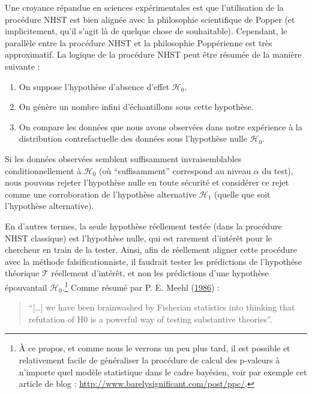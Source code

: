 \documentclass[
  a4paper,11pt,twoside,onecolumn,openright,final,oldfontcommands]{memoir}
\providecommand{\tightlist}{%
  \setlength{\itemsep}{0pt}\setlength{\parskip}{0pt}}
\theoremstyle{definition}
\theoremstyle{definition}
\theoremstyle{definition}
\theoremstyle{definition}
\theoremstyle{remark}
\begin{document}
Une croyance répandue en sciences expérimentales est que l'utilisation de la procédure NHST est bien alignée avec la philosophie scientifique de Popper (et implicitement, qu'il s'agit là de quelque chose de souhaitable). Cependant, le parallèle entre la procédure NHST et la philosophie Poppérienne est très approximatif. La logique de la procédure NHST peut être résumée de la manière suivante :

\begin{enumerate}
\def\labelenumi{\arabic{enumi}.}
\tightlist
\item
  On suppose l'hypothèse d'absence d'effet \(\mathcal{H}_{0}\).
\item
  On génère un nombre infini d'échantillons sous cette hypothèse.
\item
  On compare les données que nous avons observées dans notre expérience à la distribution contrefactuelle des données sous l'hypothèse nulle \(\mathcal{H}_{0}\).
\end{enumerate}

Si les données observées semblent suffisamment invraisemblables conditionnellement à \(\mathcal{H}_{0}\) (où ``suffisamment'' correspond au niveau \(\alpha\) du test), nous pouvons rejeter l'hypothèse nulle en toute sécurité et considérer ce rejet comme une corroboration de l'hypothèse alternative \(\mathcal{H}_{1}\) (quelle que soit l'hypothèse alternative).

En d'autres termes, la seule hypothèse réellement testée (dans la procédure NHST classique) est l'hypothèse nulle, qui est rarement d'intérêt pour le chercheur en train de la tester. Ainsi, afin de réellement aligner cette procédure avec la méthode falsificationniste, il faudrait tester les prédictions de l'hypothése théorique \(\mathcal{T}\) réellement d'intérêt, et non les prédictions d'une hypothèse épouvantail \(\mathcal{H}_{0}\).\footnote{À ce propos, et comme nous le verrons un peu plus tard, il est possible et relativement facile de généraliser la procédure de calcul des p-valeurs à n'importe quel modèle statistique dans le cadre bayésien, voir par exemple cet article de blog : \url{http://www.barelysignificant.com/post/ppc/}.} Comme résumé par P. E. Meehl (\protect\hyperlink{ref-meehl_what_1986}{1986}) :

\begin{quote}
``{[}\ldots{]} we have been brainwashed by Fisherian statistics into thinking that refutation of H0 is a powerful way of testing substantive theories''.
\end{quote}
\end{document}
